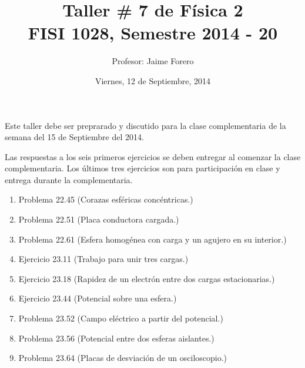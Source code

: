 \documentclass{article}
\title{Taller \# 7 de F\'isica 2\\ FISI 1028, Semestre 2014 - 20}
\author{Profesor: Jaime Forero}
\date{Viernes, 12 de Septiembre, 2014}
\begin{document}
\maketitle
\thispagestyle{empty}

\noindent

Este taller debe ser preprarado y discutido para la clase
complementaria de la semana del 15 de Septiembre del 2014.

Las respuestas a los seis primeros ejercicios se deben entregar al comenzar la
clase complementaria. Los \'ultimos tres ejercicios son para
participaci\'on en clase y entrega durante la complementaria.   

\begin{enumerate}

\item
Problema 22.45 (Corazas esf\'ericas conc\'entricas.)

\item
Problema 22.51 (Placa conductora cargada.)

\item
Problema 22.61 (Esfera homog\'enea con carga y un agujero en su interior.)

\item
Ejercicio 23.11 (Trabajo para unir tres cargas.)

\item 
Ejercicio 23.18 (Rapidez de un electr\'on entre dos cargas estacionarias.)

\item
Ejercicio 23.44 (Potencial sobre una esfera.)

\item 
Problema 23.52 (Campo el\'ectrico a partir del potencial.)

\item 
Problema 23.56 (Potencial entre dos esferas aislantes.)

\item 
Problema 23.64 (Placas de desviaci\'on de un osciloscopio.)

\end{enumerate}
\end{document}
